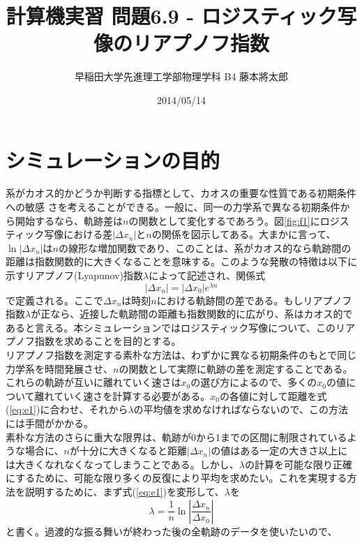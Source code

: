 \documentclass{jsarticle}
\title{計算機実習 問題6.9 - ロジスティック写像のリアプノフ指数}
\author{早稲田大学先進理工学部物理学科 B4 藤本將太郎}
\date{2014/05/14}
\begin{document}
\maketitle
    
    \section{シミュレーションの目的}
        系がカオス的かどうか判断する指標として、カオスの重要な性質である初期条件への敏感
        さを考えることができる。一般に、同一の力学系で異なる初期条件から開始するなら、軌跡差は$n$の関数として変化するであろう。図\ref{fig:f1}にロジスティック写像における差$|\Delta x_{n}|$と$n$の関係を図示してある。大まかに言って、$\ln |\Delta x_{n}|$は$n$の線形な増加関数であり、このことは、系がカオス的なら軌跡間の距離は指数関数的に大きくなることを意味する。このような発散の特徴は以下に示すリアプノフ(Lyapunov)指数$\lambda$によって記述され、関係式
        \begin{equation}
            |\Delta x_{n}| = |\Delta x_{0}|e^{\lambda n}
            \label{eq:e1}
        \end{equation}
        で定義される。ここで$\Delta x_{n}$は時刻$n$における軌跡間の差である。もしリアプノフ指数$\lambda$が正なら、近接した軌跡間の距離も指数関数的に広がり、系はカオス的であると言える。本シミュレーションではロジスティック写像について、このリアプノフ指数を求めることを目的とする。\\
        リアプノフ指数を測定する素朴な方法は、わずかに異なる初期条件のもとで同じ力学系を時間発展させ、$n$の関数として実際に軌跡の差を測定することである。これらの軌跡が互いに離れていく速さは$x_{0}$の選び方によるので、多くの$x_{0}$の値について離れていく速さを計算する必要がある。$x_{0}$の各値に対して距離を式(\ref{eq:e1})に合わせ、それから$\lambda$の平均値を求めなければならないので、この方法には手間がかかる。\\
        素朴な方法のさらに重大な限界は、軌跡が0から1までの区間に制限されているような場合に、$n$が十分に大きくなると距離$|\Delta x_{n}|$の値はある一定の大きさ以上には大きくなれなくなってしまうことである。しかし、$\lambda$の計算を可能な限り正確にするために、可能な限り多くの反復により平均を求めたい。これを実現する方法を説明するために、まず式(\ref{eq:e1})を変形して、$\lambda$を
        \begin{equation}
            \lambda=\frac{1}{n}\ln \left| \frac{\Delta x_{n}}{\Delta x_{0}} \right|
        \end{equation}
        と書く。過渡的な振る舞いが終わった後の全軌跡のデータを使いたいので、
\end{document}
